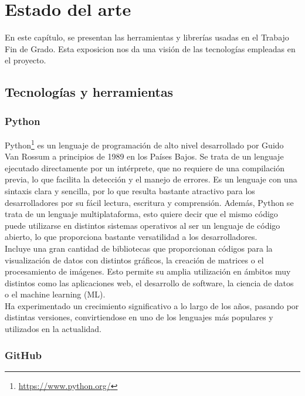 \documentclass[a4paper, 12pt]{book}
\begin{document}
\cleardoublepage
\chapter{Estado del arte}
\label{chap:estado-arte}

En este capítulo, se presentan las herramientas y librerías usadas en el Trabajo Fin de Grado.
Esta exposicion nos da una visión de las tecnologías empleadas en el proyecto.

\section{Tecnologías y herramientas} 
\label{sec:tecnologias-herramientas}

\subsection{Python}
\label{subsec:python}

Python\footnote{\url{https://www.python.org/}} es un lenguaje de programación de alto nivel desarrollado por Guido Van Rossum a principios de 1989 en los Países Bajos.
Se trata de un lenguaje ejecutado directamente por un intérprete, que no requiere de una compilación previa, lo que facilita la detección y el manejo de errores. 
Es un lenguaje con una sintaxis clara y sencilla, por lo que resulta bastante atractivo para los desarrolladores por su fácil lectura, escritura y comprensión.
Además, Python se trata de un lenguaje multiplataforma, esto quiere decir que el mismo código puede utilizarse en distintos sistemas operativos al ser un lenguaje de código abierto,
lo que proporciona bastante versatilidad a los desarrolladores.
\\Incluye una gran cantidad de bibliotecas que proporcionan códigos para la visualización de datos con distintos gráficos, la creación de matrices o el procesamiento de imágenes. Esto permite
su amplia utilización en ámbitos muy distintos como las aplicaciones web, el desarrollo de software, la ciencia de datos o el machine learning (ML).
\\Ha experimentado un crecimiento significativo a lo largo de los años, pasando por distintas versiones, convirtiendose en uno de los lenguajes más populares y utilizados en la actualidad.

\subsection{GitHub}
\label{subsec:github}
\end{document}
